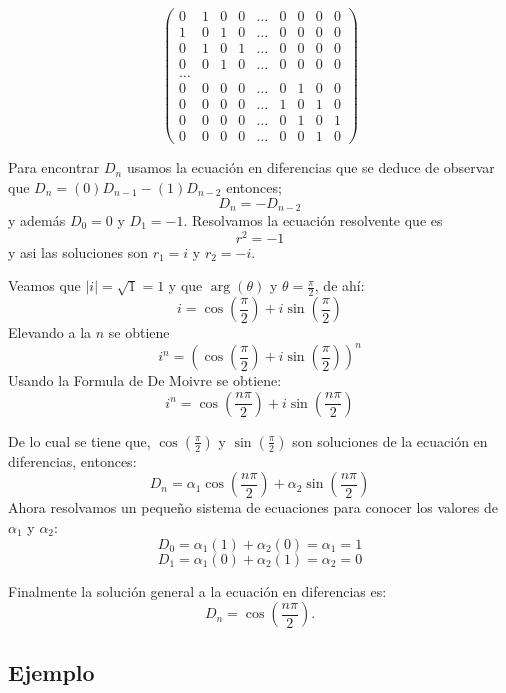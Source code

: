 \documentclass{report}
\begin{document}
\begin{equation*}
\begin{pmatrix}
0 & 1 & 0 & 0 &\ldots & 0 & 0 & 0 & 0\\
1 & 0 & 1 & 0 &\ldots & 0 & 0 & 0 & 0\\
0 & 1 & 0 & 1 &\ldots & 0 & 0 & 0 & 0\\
0 & 0 & 1 & 0 &\ldots & 0 & 0 & 0 & 0\\
\ldots\\
0 & 0 & 0 & 0 &\ldots & 0 & 1 & 0 & 0\\
0 & 0 & 0 & 0 &\ldots & 1 & 0 & 1 & 0\\
0 & 0 & 0 & 0 &\ldots & 0 & 1 & 0 & 1\\
0 & 0 & 0 & 0 &\ldots & 0 & 0 & 1 & 0
\end{pmatrix}
\end{equation*}


Para encontrar $D_{n}$ usamos la ecuación en diferencias que se deduce de observar
que $D_{n}=(0)D_{n-1}-(1)D_{n-2}$ entonces;
\begin{equation}
  \label{determinante}
D_{n}=-D_{n-2}
\end{equation}
 y además $D_{0}=0$ y $D_{1}=-1$.
Resolvamos la ecuación resolvente que es $$r^{2}=-1$$ y asi las soluciones son $r_{1}=i$ y  $r_{2}=-i$.

Veamos que  $|i|=\sqrt{1}=1$ y que $\arg(\theta)$ y $\theta= \frac{\pi}{2}$, de ahí:
$$i=\cos(\frac{\pi}{2})+i\sin(\frac{\pi}{2})$$
Elevando a la $n$ se obtiene
$$i^n=(\cos(\frac{\pi}{2})+i\sin(\frac{\pi}{2}))^{n}$$
Usando la Formula de De Moivre se obtiene:
$$i^n=\cos(\frac{n\pi}{2})+i\sin(\frac{n\pi}{2})$$

De lo cual se tiene que, $\cos(\frac{\pi}{2})$ y  $\sin(\frac{\pi}{2})$ son soluciones de la ecuación en diferencias, entonces: 
$$D_{n}=\alpha_{1}\cos(\frac{n\pi}{2})+\alpha_{2}\sin(\frac{n\pi}{2})$$
Ahora resolvamos un pequeño sistema de ecuaciones para conocer los valores de $\alpha_1$ y $\alpha_2$:
  $$D_{0}=\alpha_{1}(1)+\alpha_{2}(0)=\alpha_{1}=1$$
  $$D_{1}=\alpha_{1}(0)+\alpha_{2}(1)=\alpha_{2}=0$$

Finalmente la solución general a la ecuación en diferencias es:
\begin{equation}
  \label{solucion determinante}
D_{n}=\cos(\frac{n\pi}{2}).
\end{equation}


\subsection{Ejemplo}
\end{document}
